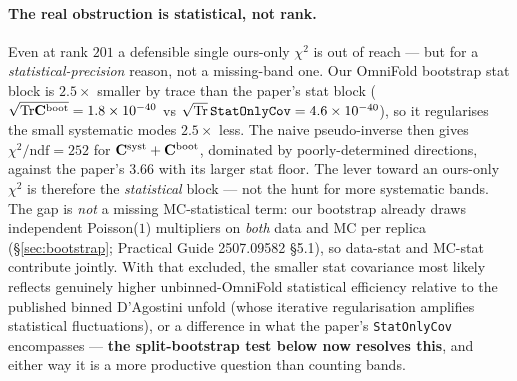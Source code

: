 \paragraph{The real obstruction is statistical, not rank.}
Even at rank $201$ a defensible single ours-only $\chi^{2}$ is out of
reach --- but for a \emph{statistical-precision} reason, not a missing-band
one. Our OmniFold bootstrap stat block is $2.5\times$ smaller by trace than
the paper's stat block ($\sqrt{\mathrm{Tr}\mathbf{C}^{\text{boot}}}=1.8\times10^{-40}$ vs
$\sqrt{\mathrm{Tr}}\,\texttt{StatOnlyCov}=4.6\times10^{-40}$), so it regularises the
small systematic modes $2.5\times$ less. The naive pseudo-inverse then gives
$\chi^{2}/\mathrm{ndf}=252$ for $\mathbf{C}^{\text{syst}}+\mathbf{C}^{\text{boot}}$,
dominated by poorly-determined directions, against the paper's $3.66$ with
its larger stat floor. The lever toward an ours-only $\chi^{2}$ is therefore
the \emph{statistical} block --- not the hunt for more systematic bands.
The gap is \emph{not} a missing MC-statistical term: our bootstrap already
draws independent Poisson($1$) multipliers on \emph{both} data and MC per
replica (\S\ref{sec:bootstrap}; Practical Guide 2507.09582 \S5.1), so
data-stat and MC-stat contribute jointly. With that excluded, the smaller
stat covariance most likely reflects genuinely higher unbinned-OmniFold
statistical efficiency relative to the published binned D'Agostini unfold
(whose iterative regularisation amplifies statistical fluctuations), or a
difference in what the paper's \texttt{StatOnlyCov} encompasses ---
\textbf{the split-bootstrap test below now resolves this}, and either way it is
a more productive question than counting bands.

